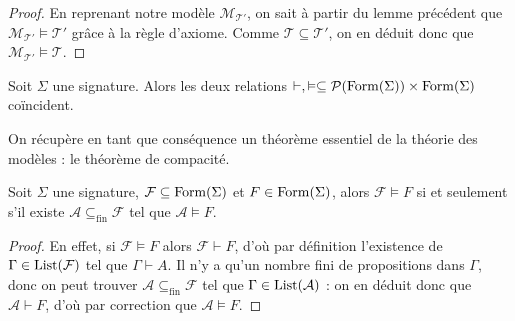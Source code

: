 \begin{proof}
  En reprenant notre modèle $\mathcal M_{\mathcal T'}$, on sait à partir du lemme
  précédent que $\mathcal M_{\mathcal T'}\models \mathcal T'$ grâce à la règle
  d'axiome. Comme $\mathcal T\subseteq\mathcal T'$, on en déduit donc que
  $\mathcal M_{\mathcal T'}\models \mathcal T$.
\end{proof}

\begin{theorem}
  Soit $\Sigma$ une signature. Alors les deux relations
  $\vdash,\vDash\subseteq \mathcal{P}(\operatorname{Form}(\Sigma))\times\operatorname{Form}(\Sigma)$
  coïncident.
\end{theorem}

On récupère en tant que conséquence un théorème essentiel de la théorie des
modèles : le théorème de compacité.

\begin{theorem}
  Soit $\Sigma$ une signature, $\mathcal F \subseteq\operatorname{Form}(\Sigma)$ et
  $F\in\operatorname{Form}(\Sigma)$, alors $\mathcal F\vDash F$ si et seulement s'il existe
  $\mathcal A\subseteq_{\mathrm{fin}} \mathcal F$ tel que
  $\mathcal A\vDash F$.
\end{theorem}

\begin{proof}
  En effet, si $\mathcal F\vDash F$ alors $\mathcal F\vdash F$, d'où par
  définition l'existence de $\Gamma\in\operatorname{List}(\mathcal F)$ tel que
  $\Gamma\vdash A$. Il n'y a qu'un nombre fini de propositions dans $\Gamma$,
  donc on peut trouver $\mathcal A\subseteq_{\mathrm{fin}}\mathcal F$ tel que
  $\Gamma\in\operatorname{List}(\mathcal A)$ : on en déduit donc que $\mathcal A\vdash F$,
  d'où par correction que $\mathcal A\vDash F$.
\end{proof}
